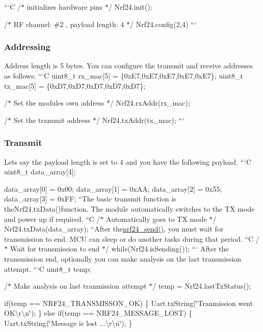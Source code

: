 ```\+C /$\ast$ initializes hardware pins $\ast$/ Nrf24.\+init();

/$\ast$ R\+F channel\+: \#2 , payload length\+: 4 $\ast$/ Nrf24.\+config(2,4) ``` \subsubsection*{Addressing}

Address length is 5 bytes. You can configure the transmit and receive addresses as follows\+: ```\+C uint8\+\_\+t rx\+\_\+mac\mbox{[}5\mbox{]} = \{0x\+E7,0x\+E7,0x\+E7,0x\+E7,0x\+E7\}; uint8\+\_\+t tx\+\_\+mac\mbox{[}5\mbox{]} = \{0x\+D7,0x\+D7,0x\+D7,0x\+D7,0x\+D7\};

/$\ast$ Set the module\textquotesingle{}s own address $\ast$/ Nrf24.\+rx\+Addr(rx\+\_\+mac);

/$\ast$ Set the transmit address $\ast$/ Nrf24.\+tx\+Addr(tx\+\_\+mac); ``` \subsubsection*{Transmit}

Let\textquotesingle{}s say the payload length is set to 4 and you have the following payload. ```\+C uint8\+\_\+t data\+\_\+array\mbox{[}4\mbox{]};

data\+\_\+array\mbox{[}0\mbox{]} = 0x00; data\+\_\+array\mbox{[}1\mbox{]} = 0x\+A\+A; data\+\_\+array\mbox{[}2\mbox{]} = 0x55; data\+\_\+array\mbox{[}3\mbox{]} = 0x\+F\+F; ``{\ttfamily  The basic transmit function is the}Nrf24.\+tx\+Data(){\ttfamily function. The module automatically switches to the T\+X mode and power up if required. }``\+C /$\ast$ Automatically goes to T\+X mode $\ast$/ Nrf24.\+tx\+Data(data\+\_\+array); ``{\ttfamily  After the}\hyperlink{nrf24_8c_ada5868d8e82fb0676d2d4c913efd608e}{nrf24\+\_\+send()}{\ttfamily , you must wait for transmission to end. M\+C\+U can sleep or do another tasks during that period. }``\+C /$\ast$ Wait for transmission to end $\ast$/ while(Nrf24.\+is\+Sending()); ``` After the transmission end, optionally you can make analysis on the last transmission attempt. ```\+C uint8\+\_\+t temp;

/$\ast$ Make analysis on last tranmission attempt $\ast$/ temp = Nrf24.\+last\+Tx\+Status();

if(temp == N\+R\+F24\+\_\+\+T\+R\+A\+N\+S\+M\+I\+S\+S\+O\+N\+\_\+\+O\+K) \{ Uart.\+tx\+String(\char`\"{}\+Tranmission went O\+K\textbackslash{}r\textbackslash{}n\char`\"{}); \} else if(temp == N\+R\+F24\+\_\+\+M\+E\+S\+S\+A\+G\+E\+\_\+\+L\+O\+S\+T) \{ Uart.\+tx\+String(\char`\"{}\+Message is lost ...\textbackslash{}r\textbackslash{}n\char`\"{}); \}

